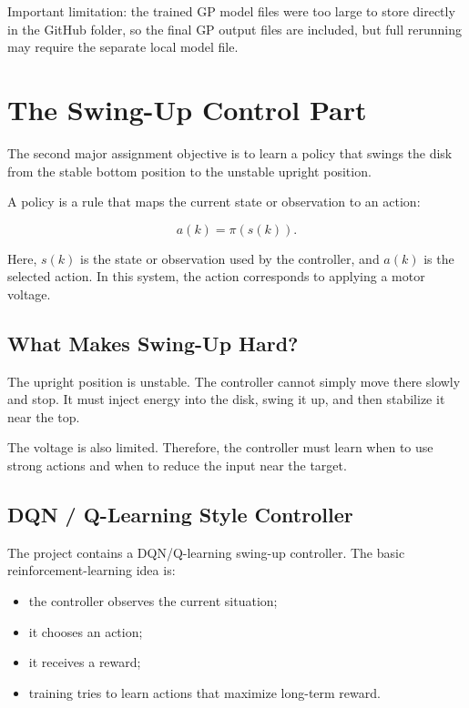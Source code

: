 \documentclass[11pt,a4paper]{article}
\begin{document}
Important limitation:
the trained GP model files were too large to store directly in the GitHub folder, so the final GP output files are included, but full rerunning may require the separate local model file.

\section{The Swing-Up Control Part}

The second major assignment objective is to learn a policy that swings the disk from the stable bottom position to the unstable upright position.

A policy is a rule that maps the current state or observation to an action:

\begin{equation}
a(k) = \pi(s(k)).
\end{equation}

Here, $s(k)$ is the state or observation used by the controller, and $a(k)$ is the selected action.
In this system, the action corresponds to applying a motor voltage.

\subsection{What Makes Swing-Up Hard?}

The upright position is unstable.
The controller cannot simply move there slowly and stop.
It must inject energy into the disk, swing it up, and then stabilize it near the top.

The voltage is also limited.
Therefore, the controller must learn when to use strong actions and when to reduce the input near the target.

\subsection{DQN / Q-Learning Style Controller}

The project contains a DQN/Q-learning swing-up controller.
The basic reinforcement-learning idea is:

\begin{itemize}
    \item the controller observes the current situation;
    \item it chooses an action;
    \item it receives a reward;
    \item training tries to learn actions that maximize long-term reward.
\end{itemize}
\end{document}
